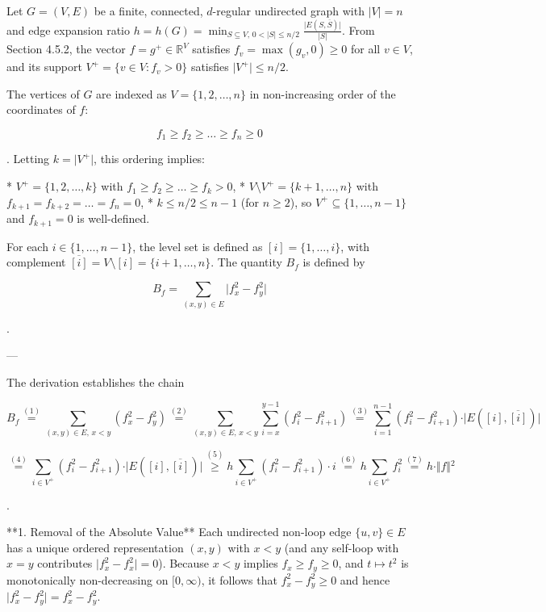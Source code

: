 \documentclass{article}
\begin{document}
Let $G = (V, E)$ be a finite, connected, $d$-regular undirected graph with $\vert{}V\vert{} = n$ and edge expansion ratio $h = h(G) = \min_{S \subseteq V,\, 0 < \vert{}S\vert{} \le n/2} \frac{\vert{}E(S, \overline{S})\vert{}}{\vert{}S\vert{}}$. From Section 4.5.2, the vector $f = g^+ \in \mathbb{R}^V$ satisfies $f_v = \max(g_v, 0) \ge 0$ for all $v \in V$, and its support $V^+ = \{v \in V : f_v > 0\}$ satisfies $\vert{}V^+\vert{} \le n/2$.

The vertices of $G$ are indexed as $V = \{1, 2, \dots, n\}$ in non-increasing order of the coordinates of $f$:


$$f_1 \ge f_2 \ge \dots \ge f_n \ge 0$$

. Letting $k = \vert{}V^+\vert{}$, this ordering implies:

* $V^+ = \{1, 2, \dots, k\}$ with $f_1 \ge f_2 \ge \dots \ge f_k > 0$,
* $V \setminus V^+ = \{k+1, \dots, n\}$ with $f_{k+1} = f_{k+2} = \dots = f_n = 0$,
* $k \le n/2 \le n - 1$ (for $n \ge 2$), so $V^+ \subseteq \{1, \dots, n-1\}$ and $f_{k+1} = 0$ is well-defined.



For each $i \in \{1, \dots, n-1\}$, the level set is defined as $[i] = \{1, \dots, i\}$, with complement $\overline{[i]} = V \setminus [i] = \{i+1, \dots, n\}$. The quantity $B_f$ is defined by


$$B_f = \sum_{(x,y) \in E} \vert{}f_x^2 - f_y^2\vert{}$$

.

---

The derivation establishes the chain


$$B_f \stackrel{(1)}{=} \sum_{(x,y) \in E,\, x < y} (f_x^2 - f_y^2) \stackrel{(2)}{=} \sum_{(x,y) \in E,\, x < y} \sum_{i=x}^{y-1} (f_i^2 - f_{i+1}^2) \stackrel{(3)}{=} \sum_{i=1}^{n-1} (f_i^2 - f_{i+1}^2) \cdot \vert{}E([i], \overline{[i]})\vert{}$$

$$\stackrel{(4)}{=} \sum_{i \in V^+} (f_i^2 - f_{i+1}^2) \cdot \vert{}E([i], \overline{[i]})\vert{} \stackrel{(5)}{\ge} h \sum_{i \in V^+} (f_i^2 - f_{i+1}^2) \cdot i \stackrel{(6)}{=} h \sum_{i \in V^+} f_i^2 \stackrel{(7)}{=} h \cdot \Vert{}f\Vert{}^2$$

.

**1. Removal of the Absolute Value**
Each undirected non-loop edge $\{u, v\} \in E$ has a unique ordered representation $(x, y)$ with $x < y$ (and any self-loop with $x = y$ contributes $\vert{}f_x^2 - f_x^2\vert{} = 0$). Because $x < y$ implies $f_x \ge f_y \ge 0$, and $t \mapsto t^2$ is monotonically non-decreasing on $[0, \infty)$, it follows that $f_x^2 - f_y^2 \ge 0$ and hence $\vert{}f_x^2 - f_y^2\vert{} = f_x^2 - f_y^2$.
\end{document}

